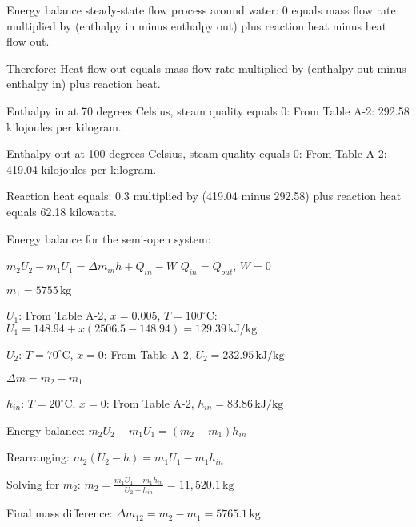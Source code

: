 Energy balance steady-state flow process around water:  
0 equals mass flow rate multiplied by (enthalpy in minus enthalpy out) plus reaction heat minus heat flow out.  

Therefore:  
Heat flow out equals mass flow rate multiplied by (enthalpy out minus enthalpy in) plus reaction heat.  

Enthalpy in at 70 degrees Celsius, steam quality equals 0:  
From Table A-2: 292.58 kilojoules per kilogram.  

Enthalpy out at 100 degrees Celsius, steam quality equals 0:  
From Table A-2: 419.04 kilojoules per kilogram.  

Reaction heat equals:  
0.3 multiplied by (419.04 minus 292.58) plus reaction heat equals 62.18 kilowatts.

Energy balance for the semi-open system:  

\( m_2 U_2 - m_1 U_1 = \Delta m_{in} h + Q_{in} - W \)  
\( Q_{in} = Q_{out} \), \( W = 0 \)  

\( m_1 = 5755 \, \text{kg} \)  

\( U_1 \): From Table A-2, \( x = 0.005 \), \( T = 100^\circ \text{C} \):  
\( U_1 = 148.94 + x (2506.5 - 148.94) = 129.39 \, \text{kJ/kg} \)  

\( U_2 \): \( T = 70^\circ \text{C} \), \( x = 0 \):  
From Table A-2, \( U_2 = 232.95 \, \text{kJ/kg} \)  

\( \Delta m = m_2 - m_1 \)  

\( h_{in} \): \( T = 20^\circ \text{C} \), \( x = 0 \):  
From Table A-2, \( h_{in} = 83.86 \, \text{kJ/kg} \)  

Energy balance:  
\( m_2 U_2 - m_1 U_1 = (m_2 - m_1) h_{in} \)  

Rearranging:  
\( m_2 (U_2 - h) = m_1 U_1 - m_1 h_{in} \)  

Solving for \( m_2 \):  
\( m_2 = \frac{m_1 U_1 - m_1 h_{in}}{U_2 - h_{in}} = 11,520.1 \, \text{kg} \)  

Final mass difference:  
\( \Delta m_{12} = m_2 - m_1 = 5765.1 \, \text{kg} \)